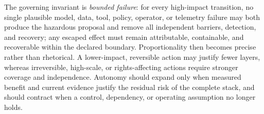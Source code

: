 The governing invariant is \emph{bounded failure}: for every high-impact transition, no single plausible model, data, tool, policy, operator, or telemetry failure may both produce the hazardous proposal and remove all independent barriers, detection, and recovery; any escaped effect must remain attributable, containable, and recoverable within the declared boundary. Proportionality then becomes precise rather than rhetorical. A lower-impact, reversible action may justify fewer layers, whereas irreversible, high-scale, or rights-affecting actions require stronger coverage and independence. Autonomy should expand only when measured benefit and current evidence justify the residual risk of the complete stack, and should contract when a control, dependency, or operating assumption no longer holds.

